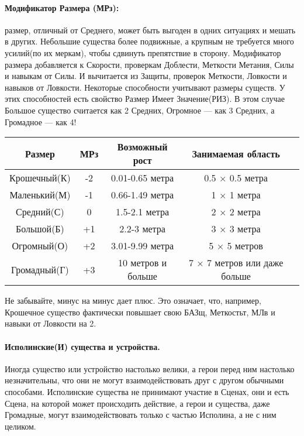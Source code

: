 \paragraph{Модификатор Размера (МРз):} размер, отличный от Среднего, может быть выгоден в одних ситуациях и мешать в других. Небольшие существа более подвижные, а крупным не требуется много усилий(по их меркам), чтобы сдвинуть препятствие в сторону.
\newline
Модификатор размера добавляется к Скорости, проверкам Доблести, Меткости Метания, Силы и навыкам от Силы. И вычитается из Защиты, проверок Меткости, Ловкости и навыков от Ловкости.
\newline
Некоторые способности учитывают размеры существ. У этих способностей есть свойство Размер Имеет Значение(РИЗ). В этом случае Большое существо считается как 2 Средних, Огромное — как 3 Средних, а Громадное — как 4!
\begin{center}
\begin{tabular}{ |c|c|c|c|c| }
\hline
Размер & МРз & Возможный рост & Занимаемая область
\\ \hline
Крошечный(К) & -2 & 0.01-0.65 метра & 0.5 × 0.5 метра
\\ \hline
Маленький(М) & -1 & 0.66-1.49 метра & 1 × 1 метра
\\ \hline
Средний(С) & 0 & 1.5-2.1 метра & 2 × 2 метра
\\ \hline
Большой(Б) & +1 & 2.2-3 метра & 3 × 3 метра
\\ \hline
Огромный(О) & +2 & 3.01-9.99 метра & 5 × 5 метров
\\ \hline
Громадный(Г) & +3 & 10 метров и больше & 7 × 7 метров или даже больше
\\ \hline
\end{tabular}
\end{center}
\begin{tcolorbox}
Не забывайте, минус на минус дает плюс. Это означает, что, например, Крошечное существо фактически повышает свою БАЗщ, Меткостьт, МЛв и навыки от Ловкости на 2.
\end{tcolorbox}
\paragraph{Исполинские(И) существа и устройства.} Иногда существо или устройство настолько велики, а герои перед ним настолько незначительны, что они не могут взаимодействовать друг с другом обычными способами. Исполинские существа не принимают участие в Сценах, они и есть Сцена, на которой может происходить действие, а герои и существа, даже Громадные, могут взаимодействовать только с частью Исполина, а не с ним целиком.